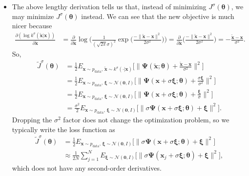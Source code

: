 \documentclass[10pt]{article}
\newcommand{\ve}[1]{\mathbf{#1}}
\newcommand{\mrm}[1]{\mathrm{#1}}
\newcommand{\ves}[1]{\boldsymbol{#1}}
\newcommand{\mcal}[1]{\mathcal{#1}}
\begin{document}
\begin{itemize}
  \item The above lengthy derivation tells us that, instead of minimizing $J^\sigma(\ves{\theta})$, we may minimize $J^\sigma(\ves{\theta})$ instead. We can see that the new objective is much nicer because
  \begin{align} \label{eqn:transition-score}
    \frac{\partial(\log k^\sigma(\widetilde{\ve{x}}|\ve{x}))}{\partial \widetilde{\ve{x}}} 
    &= \frac{\partial}{\partial \widetilde{\ve{x}}} \log \bigg( \frac{1}{(\sqrt{2\pi}\sigma)^2} \exp\bigg( \frac{-\| \widetilde{\ve{x}} - \ve{x} \|^2 }{2\sigma^2} \bigg)\bigg) 
    = \frac{\partial}{\partial \widetilde{\ve{x}}} \bigg( \frac{-\| \widetilde{\ve{x}} - \ve{x} \|^2 }{2\sigma^2} \bigg)
    = -\frac{\widetilde{\ve{x}}-\ve{x}}{\sigma^2}.
  \end{align}
  So,
  \begin{align*}
    \widetilde{J}^\sigma(\ves{\theta})
    &= \frac{1}{2} E_{\ve{x}\sim p_{\mrm{data}},\, \widetilde{\ve{x}} \sim k^\sigma(\cdot|\ve{x})} \bigg[ \bigg\|
    \ves{\Psi}({\widetilde{\ve{x}};\ves{\theta}}) + \frac{\widetilde{\ve{x}}-\ve{x}}{\sigma^2}
    \bigg\|^2 \bigg] \\
    &= \frac{1}{2} E_{\ve{x}\sim p_{\mrm{data}},\, \ves{\xi} \sim \mcal{N}(\ve{0},I)} \bigg[ \bigg\|
    \ves{\Psi}(\ve{x} + \sigma \ves{\xi};\ves{\theta}) + \frac{\sigma \ves{\xi}}{\sigma^2}
    \bigg\|^2 \bigg] \\
    &= \frac{1}{2} E_{\ve{x}\sim p_{\mrm{data}},\, \ves{\xi} \sim \mcal{N}(\ve{0},I)} \bigg[ \bigg\|
    \ves{\Psi}(\ve{x} + \sigma \ves{\xi};\ves{\theta}) + \frac{\ves{\xi}}{\sigma}
    \bigg\|^2 \bigg] \\
    &= \frac{\sigma^2}{2}  E_{\ve{x}\sim p_{\mrm{data}},\, \ves{\xi} \sim \mcal{N}(\ve{0},I)} \big[ \big\|
    \sigma \ves{\Psi}(\ve{x} + \sigma \ves{\xi};\ves{\theta}) + \ves{\xi}
    \big\|^2 \big].
  \end{align*}
  Dropping the $\sigma^2$ factor does not change the optimization problem, so we typically write the loss function as
  \begin{align*}
    \widetilde{J}^\sigma(\ves{\theta})
    &= \frac{1}{2} E_{\ve{x}\sim p_{\mrm{data}},\, \ves{\xi} \sim \mcal{N}(\ve{0},I)} \big[ \big\|
    \sigma \ves{\Psi}(\ve{x} + \sigma \ves{\xi};\ves{\theta}) + \ves{\xi}
    \big\|^2 \big] \\        
    &\approx \frac{1}{2N} \sum_{j=1}^N E_{\ves{\xi} \sim \mcal{N}(\ve{0},I )} \Big[ \big\|
    \sigma \ves{\Psi}(\ve{x}_j + \sigma \ves{\xi}; \ves{\theta}) + \ves{\xi} \big\|^2
    \Big],
  \end{align*}
  which does not have any second-order derivatives.


\end{itemize}
\end{document}
